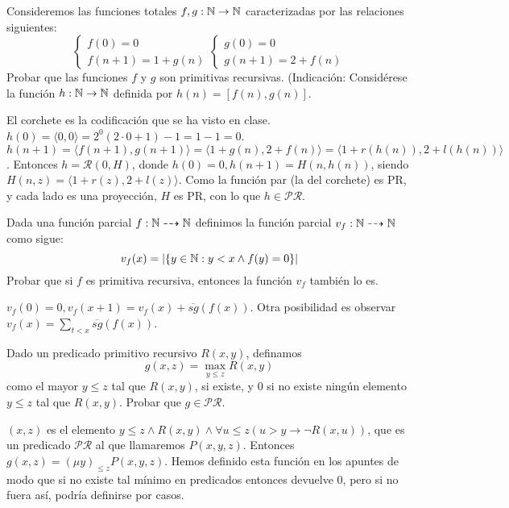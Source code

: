 \documentclass[twoside]{article}
\begin{document}
\newpage

\begin{ejercicio}{14}
Consideremos las funciones totales $f, g : \mathbb{N} \to \mathbb{N}$ caracterizadas por las relaciones
siguientes:
\[
\begin{cases}
f(0) = 0\\
f(n + 1) = 1 + g(n)
\end{cases}\begin{cases}
g(0) = 0\\
g(n + 1) = 2 + f(n)
\end{cases}
\]
Probar que las funciones $f$ y $g$ son primitivas recursivas. (Indicación: Considérese la función
$h : \mathbb{N} \to \mathbb{N}$ definida por $h(n) = [f(n), g(n)]$.
\end{ejercicio}
\begin{solucion}
El corchete es la codificación que se ha visto en clase. $h(0)=\langle 0,0\rangle =2^0(2\cdot 0+1)-1=1-1=0$. $h(n+1)=\langle f(n+1),g(n+1)\rangle=\langle 1+g(n),2+f(n)\rangle=\langle 1+r(h(n)),2+l(h(n))\rangle$. Entonces $h=\mathcal{R}(0,H)$, donde $h(0)=0, h(n+1)=H(n,h(n))$, siendo $H(n,z)=\langle 1+r(z),2+l(z)\rangle$. Como la función par (la del corchete) es PR, y cada lado es una proyección, $H$ es PR, con lo que $h\in\mathcal{PR}$.
\end{solucion}

\newpage

\begin{ejercicio}{15}
Dada una función parcial $f : \mathbb{N} \dashrightarrow \mathbb{N}$ definimos la función parcial $v_f : \mathbb{N}\dashrightarrow \mathbb{N}$
como sigue:
\[ v_f (x) = |\{y \in \mathbb{N} : y < x \land f(y) = 0\}|\]
Probar que si $f$ es primitiva recursiva, entonces la función $v_f$ también lo es.

\end{ejercicio}
\begin{solucion}
$v_f(0)=0, v_f(x+1)=v_f(x)+\overline{sg}(f(x))$. Otra posibilidad es observar $v_f(x)=\sum_{t< x}\overline{sg}(f(x))$. 
\end{solucion}

\newpage

\begin{ejercicio}{16}
Dado un predicado primitivo recursivo $R(x, y)$, definamos
\[g(x, z) = \max_{y\leq z}R(x, y)\]
como el mayor $y \leq z$ tal que $R(x, y)$, si existe, y 0 si no existe ningún elemento $y \leq z$ tal que
$R(x, y)$. Probar que $g \in \mathcal{PR}$.
\end{ejercicio}
\begin{solucion}
$(x,z)$ es el elemento $y\leq z\land R(x,y)\land \forall u\leq z(u>y\rightarrow \neg R(x,u))$, que es un predicado $\mathcal{PR}$ al que llamaremos $P(x,y,z)$. Entonces $g(x,z)=(\mu y)_{\leq z} P(x,y,z)$. Hemos definido esta función en los apuntes de modo que si no existe tal mínimo en predicados entonces devuelve 0, pero si no fuera así, podría definirse por casos.
\end{solucion}
\end{document}
